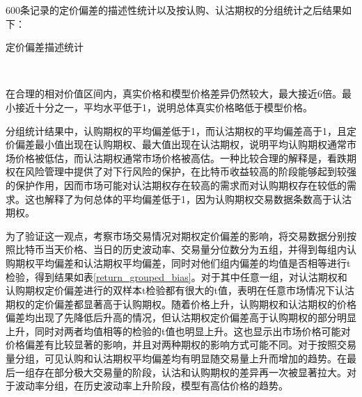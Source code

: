 600条记录的定价偏差的描述性统计以及按认购、认沽期权的分组统计之后结果如下：
~\\
\begin{center}
\begin{threeparttable}[H]
\begin{small}
\caption{定价偏差描述统计}
\label{tab:option_bias_group}
    
    
\end{small} 
\end{threeparttable}
\end{center}
~\\
\par{在合理的相对价值区间内，真实价格和模型价格差异仍然较大，最大接近6倍。最小接近十分之一，平均水平低于1，说明总体真实价格略低于模型价格。}
\par{分组统计结果中，认购期权的平均偏差低于1，而认沽期权的平均偏差高于1，且定价偏差最小值出现在认购期权、最大值出现在认沽期权，说明平均认购期权通常市场价格被低估，而认沽期权通常市场价格被高估。一种比较合理的解释是，看跌期权在风险管理中提供了对下行风险的保护，在比特币收益较高的阶段能够起到较强的保护作用，因而市场可能对认沽期权存在较高的需求而对认购期权存在较低的需求。这也解释了为何总体的平均偏差低于1，因为认购期权交易数据条数高于认沽期权。}
\par{为了验证这一观点，考察市场交易情况对期权定价偏差的影响，将交易数据分别按照比特币当天价格、当日的历史波动率、交易量分位数分为五组，并得到每组内认购期权平均偏差和认沽期权平均偏差，同时对他们组内偏差的均值是否相等进行t检验，得到结果如表\ref{return_grouped_bias}。对于其中任意一组，对认沽期权和认购期权定价偏差进行的双样本t检验都有很大的t值，表明在任意市场情况下认沽期权的定价偏差都显著高于认购期权。随着价格上升，认购期权和认沽期权的价格偏差均出现了先降低后升高的情况，但认沽期权定价偏差高于认购期权的部分明显上升，同时对两者均值相等的检验的t值也明显上升。这也显示出市场价格可能对价格偏差有比较显著的影响，并且对两种期权的影响方式可能不同。对于按照交易量分组，可见认购和认沽期权平均偏差均有明显随交易量上升而增加的趋势。在最后一组存在部分极大交易量的阶段，认沽和认购期权的差异再一次被显著拉大。对于波动率分组，在历史波动率上升阶段，模型有高估价格的趋势。}
